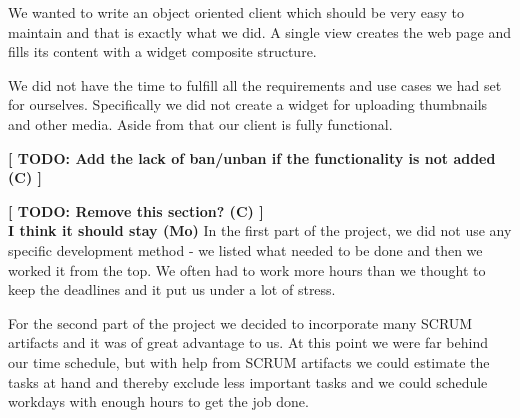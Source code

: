 We wanted to write an object oriented client which should be very easy to maintain and that is exactly what we did. A single view creates the web page and fills its content with a widget composite structure.

We did not have the time to fulfill all the requirements and use cases we had set for ourselves. Specifically we did not create a widget for uploading thumbnails and other media. Aside from that our client is fully functional.

\textbf{[ TODO: Add the lack of ban/unban if the functionality is not added (C) ]}

\textbf{[ TODO: Remove this section? (C) ] \\
I think it should stay (Mo)}
In the first part of the project, we did not use any specific development method - we listed what needed to be done and then we worked it from the top. We often had to work more hours than we thought to keep the deadlines and it put us under a lot of stress.

For the second part of the project we decided to incorporate many SCRUM artifacts and it was of great advantage to us. At this point we were far behind our time schedule, but with help from SCRUM artifacts we could estimate the tasks at hand and thereby exclude less important tasks and we could schedule workdays with enough hours to get the job done.
\newpage